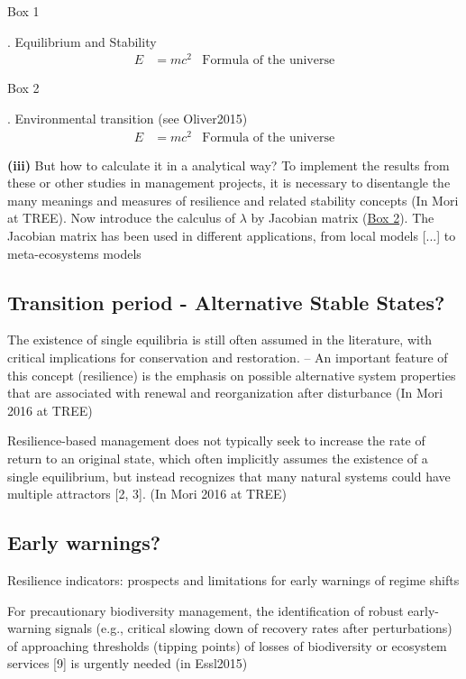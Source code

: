 \begin{tcolorbox}
\hypertarget{box1}{Box 1}. Equilibrium and Stability
\begin{align}
E &= mc^2 & \text{Formula of the universe}
\end{align}
\end{tcolorbox}

\begin{tcolorbox}
\hypertarget{box2}{Box 2}. Environmental transition (see Oliver2015)
\begin{align}
E &= mc^2 & \text{Formula of the universe}
\end{align}
\end{tcolorbox}

\textbf{(iii)} But how to calculate it in a analytical way?
To implement the results from these or other studies in management projects, it is necessary to disentangle the many meanings and measures of resilience and related stability concepts (In Mori at TREE).
Now introduce the calculus of $\lambda$ by Jacobian matrix (\hyperlink{box2}{Box 2}).
The Jacobian matrix has been used in different applications, from local models [...] to meta-ecosystems models \parencite{Gravel2016}

\subsection{Transition period - Alternative Stable States?}
The existence of single equilibria is still often assumed in the literature, with critical implications for conservation and restoration. -- An important feature of this concept (resilience) is the emphasis on possible alternative system properties that are associated with renewal and reorganization after disturbance (In Mori 2016 at TREE)

Resilience-based management does not typically seek to increase the rate of return to an original state, which often implicitly assumes the existence of a single equilibrium, but instead recognizes that many natural systems could have multiple attractors [2, 3]. (In Mori 2016 at TREE)

\subsection{Early warnings?}

Resilience indicators: prospects and limitations for early warnings of regime shifts

For precautionary biodiversity management, the identification of robust early-warning signals (e.g., critical slowing down of recovery rates after perturbations) of approaching thresholds (tipping points) of losses of biodiversity or ecosystem services [9] is urgently needed (in Essl2015)

